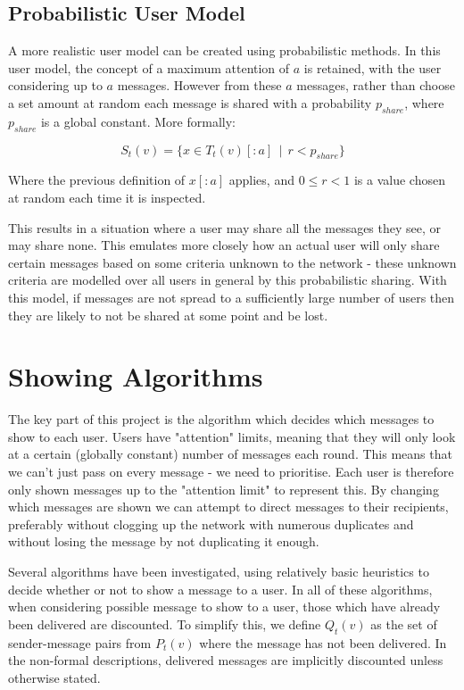\documentclass[bsc,frontabs,twoside,singlespacing,parskip,deptreport]{infthesis}     %
\begin{document}
\subsection{Probabilistic User Model}
A more realistic user model can be created using probabilistic methods. In this user model, the concept of a maximum attention of $a$ is retained, with the user considering up to $a$ messages. However from these $a$ messages, rather than choose a set amount at random each message is shared with a probability $p_{share}$, where $p_{share}$ is a global constant. More formally:

\begin{equation}
S_{t}(v) = \{x \in T_{t}(v)[:a] \:\: | \:\:  r < p_{share}\}
\end{equation}

Where the previous definition of $x[:a]$ applies, and $0 \leq r < 1$ is a value chosen at random each time it is inspected. 

This results in a situation where a user may share all the messages they see, or may share none. This emulates more closely how an actual user will only share certain messages based on some criteria unknown to the network - these unknown criteria are modelled over all users in general by this probabilistic sharing. With this model, if messages are not spread to a sufficiently large number of users then they are likely to not be shared at some point and be lost.

\section{Showing Algorithms} \label{sec:showing_algorithms}
The key part of this project is the algorithm which decides which messages to show to each user. Users have "attention" limits, meaning that they will only look at a certain (globally constant) number of messages each round. This means that we can't just pass on every message - we need to prioritise. Each user is therefore only shown messages up to the "attention limit" to represent this. By changing which messages are shown we can attempt to direct messages to their recipients, preferably without clogging up the network with numerous duplicates and without losing the message by not duplicating it enough.

Several algorithms have been investigated, using relatively basic heuristics to decide whether or not to show a message to a user. In all of these algorithms, when considering possible message to show to a user, those which have already been delivered are discounted. To simplify this, we define $Q_{t}(v)$ as the set of sender-message pairs from $P_{t}(v)$ where the message has not been delivered. In the non-formal descriptions, delivered messages are implicitly discounted unless otherwise stated.
\end{document}
